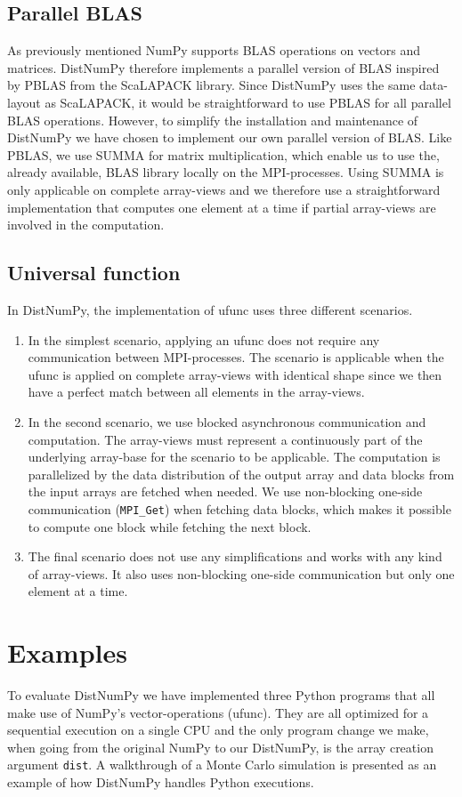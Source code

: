 \documentclass[10pt]{article}
\begin{document}
\subsection{Parallel BLAS}
As previously mentioned NumPy supports BLAS operations on vectors and matrices. DistNumPy therefore implements a parallel version of BLAS inspired by PBLAS from the ScaLAPACK library. Since DistNumPy uses the same data-layout as ScaLAPACK, it would be straightforward to use PBLAS for all parallel BLAS operations. However, to simplify the installation and maintenance of DistNumPy we have chosen to implement our own parallel version of BLAS. Like PBLAS, we use SUMMA\cite{SUMMA_GeijnW97} for matrix multiplication, which enable us to use the, already available, BLAS library locally on the MPI-processes. Using SUMMA is only applicable on complete array-views and we therefore use a straightforward implementation that computes one element at a time if partial array-views are involved in the computation. 

\subsection{Universal function}
In DistNumPy, the implementation of ufunc uses three different scenarios.
\begin{enumerate}
\item In the simplest scenario, applying an ufunc does not require any communication between MPI-processes. The scenario is applicable when the ufunc is applied on complete array-views with identical shape since we then have a perfect match between all elements in the array-views.
\item In the second scenario, we use blocked asynchronous communication and computation. The array-views must represent a continuously part of the underlying array-base for the scenario to be applicable. The computation is parallelized by the data distribution of the output array and data blocks from the input arrays are fetched when needed. We use non-blocking one-side communication (\texttt{MPI\_Get}) when fetching data blocks, which makes it possible to compute one block while fetching the next block.
\item The final scenario does not use any simplifications and works with any kind of array-views. It also uses non-blocking one-side communication but only one element at a time.
\end{enumerate}


\section{Examples}
To evaluate DistNumPy we have implemented three Python programs that all make use of NumPy's vector-operations (ufunc). They are all optimized for a sequential execution on a single CPU and the only program change we make, when going from the original NumPy to our DistNumPy, is the array creation argument \texttt{dist}. 
A walkthrough of a Monte Carlo simulation is presented as an example of how DistNumPy handles Python executions.
\end{document}
